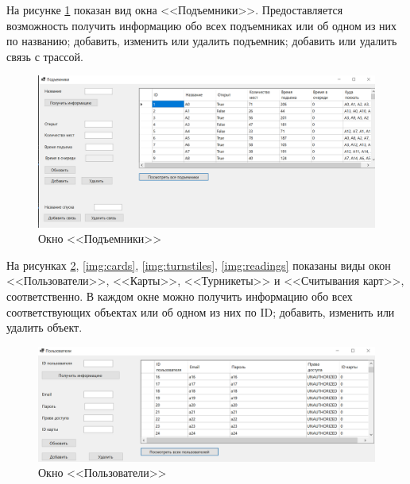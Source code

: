 На рисунке \ref{img:lifts} показан вид окна <<Подъемники>>. Предоставляется возможность получить информацию обо всех подъемниках или об одном из них по названию; добавить, изменить или удалить подъемник; добавить или удалить связь с трассой.

\clearpage
\begin{figure}[h!]
	\begin{center}
		\includegraphics[scale=0.6]{../imgs/int/lifts.png}
	\end{center}
	\captionsetup{justification=centering}
	\caption{Окно <<Подъемники>>}
	\label{img:lifts}
\end{figure}

На рисунках \ref{img:users}, \ref{img:cards}, \ref{img:turnstiles}, \ref{img:readings} показаны виды окон <<Пользователи>>, <<Карты>>, <<Турникеты>> и <<Считывания карт>>, соответственно. В каждом окне можно получить информацию обо всех соответствующих объектах или об одном из них по ID; добавить, изменить или удалить объект.

\begin{figure}[h!]
	\begin{center}
		\includegraphics[scale=0.6]{../imgs/int/users.png}
	\end{center}
	\captionsetup{justification=centering}
	\caption{Окно <<Пользователи>>}
	\label{img:users}
\end{figure}

